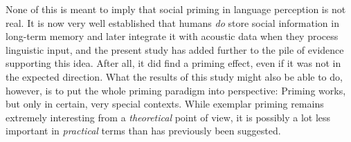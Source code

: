 None of this is meant to imply that social priming in language perception is not real.
It is now very well established that humans \emph{do} store social information in long-term memory and later integrate it with acoustic data when they process linguistic input, and the present study has added further to the pile of evidence supporting this idea.
After all, it did find a priming effect, even if it was not in the expected direction.
What the results of this study might also be able to do, however, is to put the whole priming paradigm into perspective: Priming works, but only in certain, very special contexts.
While exemplar priming remains extremely interesting from a \emph{theoretical} point of view, it is possibly a lot less important in \emph{practical} terms than has previously been suggested.